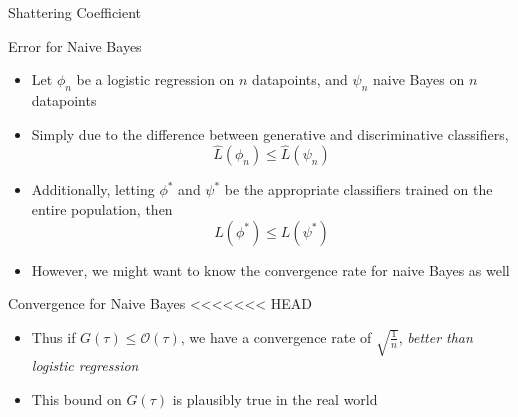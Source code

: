 \documentclass{beamer}
\renewcommand{\Pr}[1]{\mathcal{P} \left( #1 \right)}
\newcommand{\pa}[1]{\left( #1 \right)}
\newcommand{\br}[1]{\left\{ #1 \right\} }
\begin{document}
\begin{frame}{Shattering Coefficient}
\begin{frame}{Error for Naive Bayes}
\begin{itemize}
\item Let $\phi_n$ be a logistic regression on $n$ datapoints, and $\psi_n$ naive Bayes on $n$ datapoints
\item Simply due to the difference between generative and discriminative classifiers,
\[ \hat{L}(\phi_n) \leq \hat{L}(\psi_n) \]
\item Additionally, letting $\phi^*$ and $\psi^*$ be the appropriate classifiers trained on the entire population, then
\[ L(\phi^*) \leq L(\psi^*) \]
\item However, we might want to know the convergence rate for naive Bayes as well
\end{itemize}
\end{frame}

\begin{frame}{Convergence for Naive Bayes}
<<<<<<< HEAD
\begin{itemize}
\item Thus if $G(\tau) \leq \mathcal{O}(\tau)$, we have a convergence rate of $\sqrt{\frac1n}$, \emph{better than logistic regression}
\item This bound on $G(\tau)$ is plausibly true in the real world
\end{itemize}
\end{frame}


\end{frame}
\end{document}

